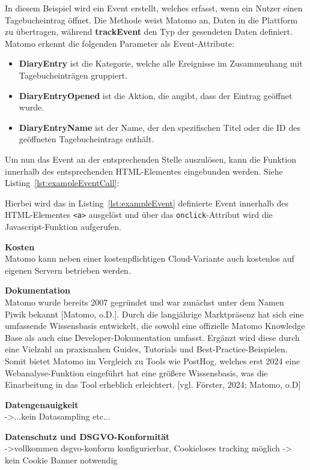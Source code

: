 In diesem Beispiel wird ein Event erstellt, welches erfasst, wenn ein Nutzer einen Tagebucheintrag öffnet. Die Methode \texttt{} weist Matomo an, Daten in die Plattform zu übertragen, während \textbf{trackEvent} den Typ der gesendeten Daten definiert. Matomo erkennt die folgenden Parameter als Event-Attribute:

\begin{itemize}
    \item \textbf{DiaryEntry} ist die Kategorie, welche alle Ereignisse im Zusammenhang mit Tagebucheinträgen gruppiert.
    \item \textbf{DiaryEntryOpened} ist die Aktion, die angibt, dass der Eintrag geöffnet wurde.
    \item \textbf{DiaryEntryName} ist der Name, der den spezifischen Titel oder die ID des geöffneten Tagebucheintrags enthält.
\end{itemize}

Um nun das Event an der entsprechenden Stelle auszulösen, kann die Funktion innerhalb des entsprechenden HTML-Elementes eingebunden werden. Siehe Listing~\ref{lst:exampleEventCall}: 

\FloatBarrier
\begin{minipage}{\linewidth}

\end{minipage}

Hierbei wird das in Listing~\ref{lst:exampleEvent} definierte Event innerhalb des HTML-Elementes \texttt{<a>} ausgelöst und über das \texttt{onclick}-Attribut wird die Javascript-Funktion aufgerufen.

\textbf{Kosten} \\
Matomo kann neben einer kostenpflichtigen Cloud-Variante auch kostenlos auf eigenen Servern betrieben werden. 

\textbf{Dokumentation} \\
Matomo wurde bereits 2007 gegründet und war zunächst unter dem Namen Piwik bekannt [Matomo, o.D.]. Durch die langjährige Marktpräsenz hat sich eine umfassende Wissensbasis entwickelt, die sowohl eine offizielle Matomo Knowledge Base als auch eine Developer-Dokumentation umfasst. Ergänzt wird diese durch eine Vielzahl an praxisnahen Guides, Tutorials und Best-Practice-Beispielen. Somit bietet Matomo im Vergleich zu Tools wie PostHog, welches erst 2024 eine Webanalyse-Funktion eingeführt hat eine größere Wissensbasis, was die Einarbeitung in das Tool erheblich erleichtert. [vgl. Förster, 2024; Matomo, o.D]

\textbf{Datengenauigkeit} \\
->...kein Datasampling etc...

\textbf{Datenschutz und DSGVO-Konformität} \\
->vollkommen dsgvo-konform konfigurierbar, Cookieloses tracking möglich -> kein Cookie Banner notwendig